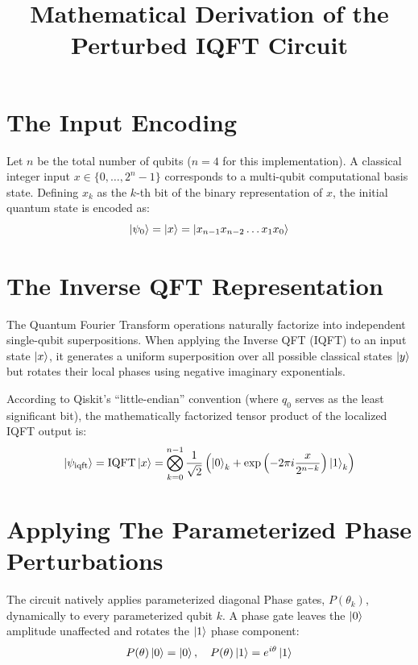 \documentclass{article}
\title{Mathematical Derivation of the Perturbed IQFT Circuit}
\author{}
\date{}
\begin{document}
\maketitle

\section{The Input Encoding}
Let $n$ be the total number of qubits ($n=4$ for this implementation). A classical integer input $x \in \{0, \dots, 2^n-1\}$ corresponds to a multi-qubit computational basis state. Defining $x_k$ as the $k$-th bit of the binary representation of $x$, the initial quantum state is encoded as:
\begin{equation}
    \ket{\psi_0} = \ket{x} = \ket{x_{n-1} x_{n-2} \dots x_1 x_0}
\end{equation}

\section{The Inverse QFT Representation}
The Quantum Fourier Transform operations naturally factorize into independent single-qubit superpositions. When applying the Inverse QFT (IQFT) to an input state $\ket{x}$, it generates a uniform superposition over all possible classical states $\ket{y}$ but rotates their local phases using negative imaginary exponentials. 

According to Qiskit's ``little-endian'' convention (where $q_0$ serves as the least significant bit), the mathematically factorized tensor product of the localized IQFT output is:
\begin{equation}
    \ket{\psi_{\text{iqft}}} = \text{IQFT}\ket{x} = \bigotimes_{k=0}^{n-1} \frac{1}{\sqrt{2}} \left( \ket{0}_k + \exp\left(-2\pi i \frac{x}{2^{n-k}}\right) \ket{1}_k \right)
\end{equation}

\section{Applying The Parameterized Phase Perturbations}
The circuit natively applies parameterized diagonal Phase gates, $P(\theta_k)$, dynamically to every parameterized qubit $k$. A phase gate leaves the $\ket{0}$ amplitude unaffected and rotates the $\ket{1}$ phase component:
\begin{equation}
    P(\theta) \ket{0} = \ket{0}, \quad P(\theta) \ket{1} = e^{i\theta} \ket{1}
\end{equation}
\end{document}
